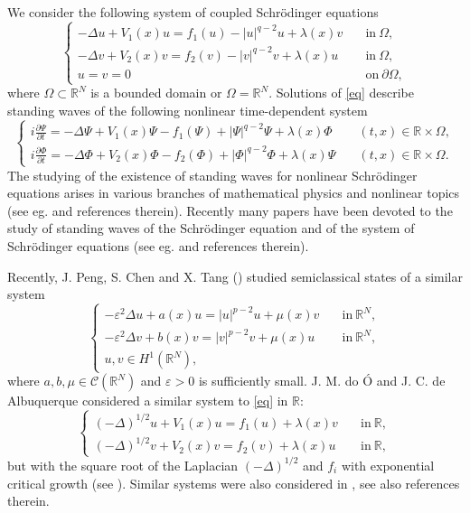 \documentclass{scrartcl}
\newcommand{\cC}{{\mathcal C}}
\newcommand{\R}{\mathbb{R}}
\numberwithin{equation}{section}
\begin{document}
We consider the following system of coupled Schr\"odinger equations
\begin{equation}\label{eq}
\left\{ \begin{array}{ll}
-\Delta u + V_1 (x) u = f_1 (u) - |u|^{q-2}u + \lambda(x)v & \quad \mbox{in} \ \Omega, \\
-\Delta v + V_2 (x) v = f_2 (v) - |v|^{q-2}v + \lambda(x)u & \quad \mbox{in} \ \Omega, \\
u = v = 0 & \quad \mbox{on} \ \partial \Omega,
\end{array} \right.
\end{equation}
where $\Omega \subset \R^N$ is a bounded domain or $\Omega = \R^N$. Solutions of \eqref{eq} describe standing waves of the following nonlinear time-dependent system
$$
\left\{ \begin{array}{ll}
i \frac{\partial \Psi}{\partial t} = -\Delta \Psi + V_1 (x) \Psi - f_1 (\Psi) + |\Psi|^{q-2}\Psi + \lambda(x)\Phi & \quad (t,x) \in \R \times \Omega, \\
i \frac{\partial \Phi}{\partial t} = -\Delta \Phi + V_2 (x) \Phi - f_2 (\Phi) + |\Phi|^{q-2}\Phi + \lambda(x)\Psi & \quad (t,x) \in \R \times \Omega.
\end{array} \right.
$$
The studying of the existence of standing waves for nonlinear
Schr\"{o}dinger equations arises in various branches of mathematical physics and nonlinear topics (see eg. \cite{Doerfler, GoodmanWinsteinJNS2001, Kuchment, Malomed, Pankov, NonlinearPhotonicCrystals} and references therein). Recently many papers have been devoted to the study of standing waves of the Schr\"odinger equation and of the system of Schr\"odinger equations (see eg. \cite{BieganowskiMederski, AmbrosettiColorado, BartschDingPeriodic, BenciGrisantiMeicheletti, BuffoniJeanStuart, ChabrowskiSzulkin2002, ChenZouCalPDE2013, CotiZelati, GuoMederski, IkomaTanaka, KryszSzulkin, LiSzulkin, Liu, MaiaJDE2006, MederskiTMNA2014, MederskiNLS2014, Rabinowitz:1992, WillemZou} and references therein).

Recently, J. Peng, S. Chen and X. Tang (\cite{PengChenTang}) studied semiclassical states of a similar system
$$
\left\{ \begin{array}{ll}
-\varepsilon^2 \Delta u + a (x) u = |u|^{p-2}u + \mu(x)v & \quad \mbox{in} \ \R^N, \\
-\varepsilon^2 \Delta v + b (x) v = |v|^{p-2}v + \mu(x)u & \quad \mbox{in} \ \R^N, \\
u,v \in H^1 (\R^N), &
\end{array} \right.
$$
where $a,b,\mu \in \cC(\R^N)$ and $\varepsilon > 0$ is sufficiently small. J. M. do \'O and J. C. de Albuquerque considered a similar system to \eqref{eq} in $\R$:
$$
\left\{ \begin{array}{ll}
(-\Delta)^{1/2} u + V_1 (x) u = f_1 (u) + \lambda(x)v & \quad \mbox{in} \ \R, \\
(-\Delta)^{1/2} v + V_2 (x) v = f_2 (v) + \lambda(x)u & \quad \mbox{in} \ \R,
\end{array} \right.
$$ 
but with the square root of the Laplacian $(-\Delta)^{1/2}$ and $f_i$ with exponential critical growth (see \cite{doO}). Similar systems were also considered in \cite{AmbrosettiCeramiRuiz, LiTang, Zhang}, see also references therein.
\end{document}
